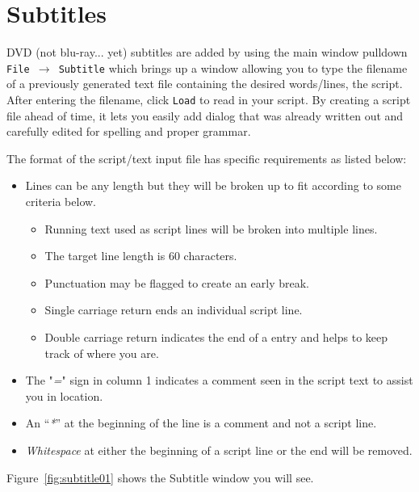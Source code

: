 \section{Subtitles}%
\label{sec:subtitles}

DVD (not blu-ray... yet) subtitles are added by using the main window pulldown   \texttt{File $\rightarrow$ Subtitle}   which brings up a window allowing you to type the filename of a previously generated text file containing the desired words/lines, the script.  After entering the filename, click \texttt{Load} to read in your script.  By creating a script file ahead of time, it lets you easily add dialog that was already written out and carefully edited for spelling and proper grammar.

The format of the script/text input file has specific requirements as listed below:

\begin{itemize}
    \item Lines can be any length but they will be broken up to fit according to some criteria below.
    \begin{itemize}
        \item Running text used as script lines will be broken into multiple lines.
        \item The target line length is 60 characters.
        \item Punctuation may be flagged to create an early break.
        \item Single carriage return ends an individual script line.
        \item Double carriage return indicates the end of a entry and helps to keep track of where you are.
    \end{itemize}
    \item The "\textit{=}" sign in column 1 indicates a comment seen in the script text to assist you in location.
    \item An “\textit{*}” at the beginning of the line is a comment and not a script line.
    \item \textit{Whitespace} at either the beginning of a script line or the end will be removed.
\end{itemize}

Figure~\ref{fig:subtitle01} shows the Subtitle window you will see.

